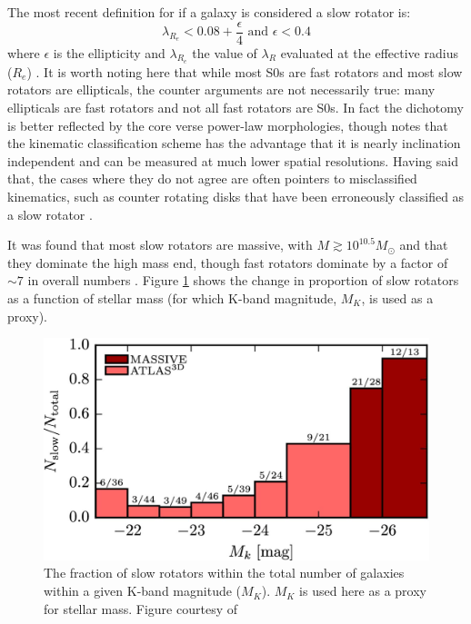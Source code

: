 	The most recent definition for if a galaxy is considered a slow rotator is:
	\begin{equation}
		\lambda_{R_e} < 0.08 + \frac{\epsilon}{4} \text{  and  } \epsilon < 0.4
	\end{equation}
	where $\epsilon$ is the ellipticity and $\lambda_{R_e}$ the value of $\lambda_R$ evaluated at the effective radius ($R_e$) \citep{Cappellari2016}. %
	It is worth noting here that while most S0s are fast rotators and most slow rotators are ellipticals, the counter arguments are not necessarily true: many ellipticals are fast rotators and not all fast rotators are S0s. In fact the dichotomy is better reflected by the core verse power-law morphologies, though \citet{Cappellari2016} notes that the kinematic classification scheme has the advantage that it is nearly inclination independent and can be measured at much lower spatial resolutions. Having said that, the cases where they do not agree are often pointers to misclassified kinematics, such as counter rotating disks that have been erroneously classified as a slow rotator \citep{Pinkney2003, Cappellari2005, Cappellari2007}. 

	It was found that most slow rotators are massive, with $M \gtrsim 10^{10.5} M_\odot$ and that they dominate the high mass end, though fast rotators dominate by a factor of $\sim 7$ in overall numbers \citep{Emsellem2011, Veale2016}. Figure \ref{fig:SlowRotFrac} shows the change in proportion of slow rotators as a function of stellar mass (for which K-band magnitude, $M_K$, is used as a proxy).


	\begin{figure}
		\centering
		\includegraphics[width=\textwidth]{introduction/slowRotFraction.jpeg}
		\caption[Proportion of Slow Rotating Galaxies as a function of Mass]{The fraction of slow rotators within the total number of galaxies within a given K-band magnitude ($M_K$). $M_K$ is used here as a proxy for stellar mass. Figure courtesy of \citet{Veale2016}}
		\label{fig:SlowRotFrac}
	\end{figure}

